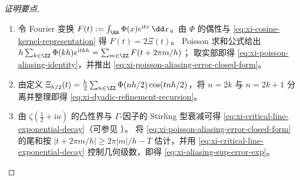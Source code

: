 \begin{proof}[证明要点]
\begin{enumerate}
  \item 令 Fourier 变换 \(F(t):=\int_{\RR}\Phi(x)e^{\mathrm{i}tx}\,\dd x\)。由 \(\Phi\) 的偶性与 \eqref{eq:xi-cosine-kernel-representation} 得 \(F(t)=2\Xi(t)\)。
  Poisson 求和公式给出
  \(
  h\sum_{k\in\ZZ}\Phi(kh)e^{\mathrm{i}tkh}
  =\sum_{m\in\ZZ}F(t+2\pi m/h)
  \)；
  取实部即得 \eqref{eq:xi-poisson-aliasing-identity}，并推出 \eqref{eq:xi-poisson-aliasing-error-closed-form}。
  \item 由定义 \(\Xi_{h/2}(t)=\frac{h}{2}\sum_{n\in\ZZ}\Phi(nh/2)\cos(tnh/2)\)，将 \(n=2k\) 与 \(n=2k+1\) 分离并整理即得 \eqref{eq:xi-dyadic-refinement-recursion}。
  \item 由 \(\zeta(\tfrac12+\mathrm{i}u)\) 的凸性界与 \(\Gamma\)-因子的 Stirling 型衰减可得 \eqref{eq:xi-critical-line-exponential-decay}（可参见 \cite{Titchmarsh1986RiemannZeta}）。
  将 \eqref{eq:xi-poisson-aliasing-error-closed-form} 的尾和按 \(|t+2\pi m/h|\ge 2\pi|m|/h-T\) 估计，并用 \eqref{eq:xi-critical-line-exponential-decay} 控制几何级数，即得 \eqref{eq:xi-aliasing-sup-error-exp}。
\end{enumerate}
\end{proof}

